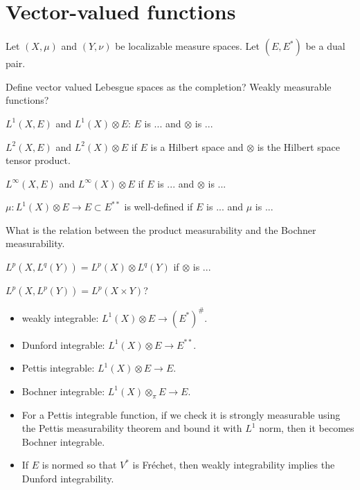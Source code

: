 \documentclass{../../large}
\begin{document}
\section{Vector-valued functions}

\begin{prb}
Let $(X,\mu)$ and $(Y,\nu)$ be localizable measure spaces.
Let $(E,E^*)$ be a dual pair.

Define vector valued Lebesgue spaces as the completion?
Weakly measurable functions?
\begin{parts}
\item $L^1(X,E)$ and $L^1(X)\otimes E$: $E$ is ... and $\otimes$ is ...
\item $L^2(X,E)$ and $L^2(X)\otimes E$ if $E$ is a Hilbert space and $\otimes$ is the Hilbert space tensor product.
\item $L^\infty(X,E)$ and $L^\infty(X)\otimes E$ if $E$ is ... and $\otimes$ is ...
\item $\mu:L^1(X)\otimes E\to E\subset E^{**}$ is well-defined if $E$ is ... and $\mu$ is ...
\item What is the relation between the product measurability and the Bochner measurability.
\item $L^p(X,L^q(Y))=L^p(X)\otimes L^q(Y)$ if $\otimes$ is ...
\item $L^p(X,L^p(Y))=L^p(X\times Y)$?
\end{parts}
\end{prb}

\begin{itemize}
\item weakly integrable: $L^1(X)\otimes E\to(E^*)^\#$.
\item Dunford integrable: $L^1(X)\otimes E\to E^{**}$.
\item Pettis integrable: $L^1(X)\otimes E\to E$.
\item Bochner integrable: $L^1(X)\otimes_\pi E\to E$.
\item For a Pettis integrable function, if we check it is strongly measurable using the Pettis measurability theorem and bound it with $L^1$ norm, then it becomes Bochner integrable.
\item If $E$ is normed so that $V^*$ is Fr\'echet, then weakly integrability implies the Dunford integrability.
\end{itemize}
\begin{pf}

\end{pf}
\end{document}
